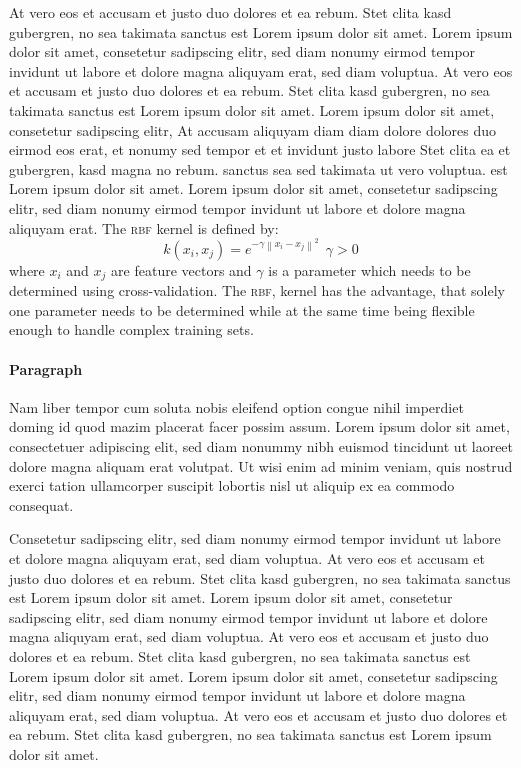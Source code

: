 At vero eos et accusam et justo duo dolores et ea rebum. Stet clita kasd gubergren, no sea takimata sanctus est Lorem ipsum dolor sit amet. Lorem ipsum dolor sit amet, consetetur sadipscing elitr, sed diam nonumy eirmod tempor invidunt ut labore et dolore magna aliquyam erat, sed diam voluptua. At vero eos et accusam et justo duo dolores et ea rebum. Stet clita kasd gubergren, no sea takimata sanctus est Lorem ipsum dolor sit amet. Lorem ipsum dolor sit amet, consetetur sadipscing elitr, At accusam aliquyam diam diam dolore dolores duo eirmod eos erat, et nonumy sed tempor et et invidunt justo labore Stet clita ea et gubergren, kasd magna no rebum. sanctus sea sed takimata ut vero voluptua. est Lorem ipsum dolor sit amet. Lorem ipsum dolor sit amet, consetetur sadipscing elitr, sed diam nonumy eirmod tempor invidunt ut labore et dolore magna aliquyam erat.
The \textsc{rbf} kernel is defined by:
\begin{equation}
	k(x_i,x_j) = e^{-\gamma \left\|x_i-x_j\right\|^2} \ \ \gamma > 0
	\label{eq:rbf}
\end{equation}
where $x_i$ and $x_j$ are feature vectors and $\gamma$ is a parameter which needs to be determined using cross-validation. The \textsc{rbf}, kernel has the advantage, that solely one parameter needs to be determined while at the same time being flexible enough to handle complex training sets.


\paragraph{Paragraph}
Nam liber tempor cum soluta nobis eleifend option congue nihil imperdiet doming id quod mazim placerat facer possim assum. Lorem ipsum dolor sit amet, consectetuer adipiscing elit, sed diam nonummy nibh euismod tincidunt ut laoreet dolore magna aliquam erat volutpat. Ut wisi enim ad minim veniam, quis nostrud exerci tation ullamcorper suscipit lobortis nisl ut aliquip ex ea commodo consequat.

Consetetur sadipscing elitr, sed diam nonumy eirmod tempor invidunt ut labore et dolore magna aliquyam erat, sed diam voluptua. At vero eos et accusam et justo duo dolores et ea rebum. Stet clita kasd gubergren, no sea takimata sanctus est Lorem ipsum dolor sit amet. Lorem ipsum dolor sit amet, consetetur sadipscing elitr, sed diam nonumy eirmod tempor invidunt ut labore et dolore magna aliquyam erat, sed diam voluptua. At vero eos et accusam et justo duo dolores et ea rebum. Stet clita kasd gubergren, no sea takimata sanctus est Lorem ipsum dolor sit amet. Lorem ipsum dolor sit amet, consetetur sadipscing elitr, sed diam nonumy eirmod tempor invidunt ut labore et dolore magna aliquyam erat, sed diam voluptua. At vero eos et accusam et justo duo dolores et ea rebum. Stet clita kasd gubergren, no sea takimata sanctus est Lorem ipsum dolor sit amet.


